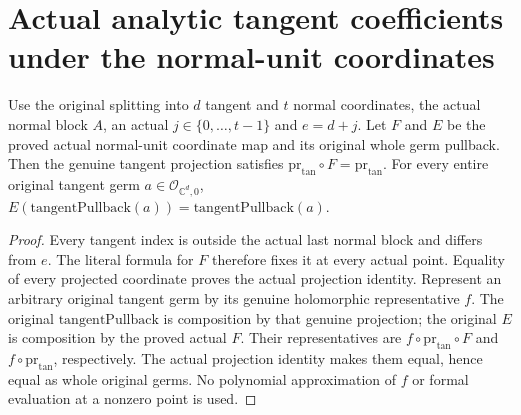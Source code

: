 \section{Actual analytic tangent coefficients under the normal-unit coordinates}

\begin{theorem}
\label{hir:actual-normal-unit-entire-tangent-coefficients}
Use the original splitting into $d$ tangent and $t$ normal coordinates,
the actual normal block $A$, an actual $j\in\{0,\ldots,t-1\}$ and
$e=d+j$. Let $F$ and $E$ be the proved actual normal-unit coordinate
map and its original whole germ pullback. Then the genuine tangent
projection satisfies $\mathrm{pr}_{\mathrm{tan}}\circ F=
\mathrm{pr}_{\mathrm{tan}}$. For every entire original tangent germ
$a\in\mathcal O_{\mathbb C^d,0}$,
$E(\mathrm{tangentPullback}(a))=\mathrm{tangentPullback}(a)$.
\leanok
\end{theorem}
\begin{proof}
Every tangent index is outside the actual last normal block and differs
from $e$. The literal formula for $F$ therefore fixes it at every
actual point. Equality of every projected coordinate proves the actual
projection identity. Represent an arbitrary original tangent germ by
its genuine holomorphic representative $f$. The original
$\mathrm{tangentPullback}$ is composition by that genuine projection;
the original $E$ is composition by the proved actual $F$. Their
representatives are $f\circ\mathrm{pr}_{\mathrm{tan}}\circ F$
and $f\circ\mathrm{pr}_{\mathrm{tan}}$, respectively. The actual
projection identity makes them equal, hence equal as whole original
germs. No polynomial approximation of $f$ or formal evaluation at a
nonzero point is used.
\end{proof}

